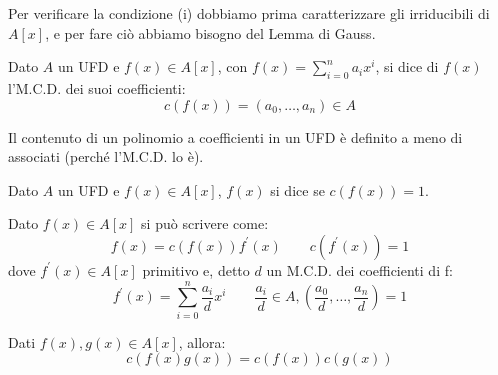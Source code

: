 \documentclass[11pt]{scrartcl}
\begin{document}
Per verificare la condizione (i) dobbiamo prima caratterizzare gli irriducibili di $A[x]$, e per fare ciò abbiamo bisogno del Lemma di Gauss.

\begin{definition}
    Dato $A$ un UFD e $f(x) \in A[x]$, con $f(x) = \sum_{i=0}^n a_ix^i$, si dice  di $f(x)$ l'M.C.D. dei suoi coefficienti:
    \[ c(f(x)) = (a_0,\ldots,a_n) \in A
        \]
\end{definition}

\begin{remark}
    Il contenuto di un polinomio a coefficienti in un UFD è definito a meno di associati (perché l'M.C.D. lo è).
\end{remark}

\begin{definition}
    Dato $A$ un UFD e $f(x) \in A[x]$, $f(x)$ si dice  se $c(f(x)) = 1$.
\end{definition}

\begin{remark}
    Dato $f(x) \in A[x]$ si può scrivere come:
    \[ f(x) = c(f(x))f^{\prime}(x) \qquad c(f^{\prime}(x)) = 1
        \]
    dove $f^{\prime}(x) \in A[x]$ primitivo e, detto $d$ un M.C.D. dei coefficienti di f:
    \[ f^{\prime}(x) = \sum_{i=0}^n \frac{a_i}{d}x^i \qquad \frac{a_i}{d} \in A, \left(\frac{a_0}{d},\ldots,\frac{a_n}{d}\right) = 1
        \]
\end{remark}

\begin{lemma}
    \label{gauss}
    Dati $f(x),g(x) \in A[x]$, allora:
    \[ c(f(x)g(x)) = c(f(x))c(g(x))
        \]
\end{lemma}
\end{document}
